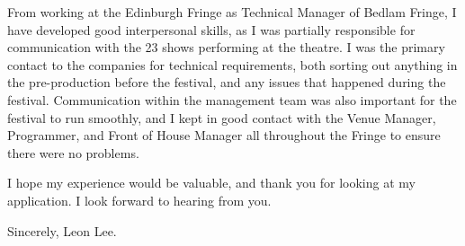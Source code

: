 \documentclass[10pt,english]{article}
\begin{document}
\medskip

From working at the Edinburgh Fringe as Technical Manager of Bedlam Fringe, I have developed good interpersonal skills, as I was partially responsible for communication with the 23 shows performing at the theatre. I was the primary contact to the companies for technical requirements, both sorting out anything in the pre-production before the festival, and any issues that happened during the festival. Communication within the management team was also important for the festival to run smoothly, and I kept in good contact with the Venue Manager, Programmer, and Front of House Manager all throughout the Fringe to ensure there were no problems.

\medskip

I hope my experience would be valuable, and thank you for looking at my application. I look forward to hearing from you.

Sincerely,
Leon Lee.
\end{document}
